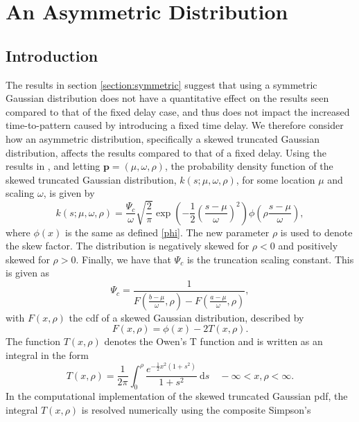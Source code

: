 \section{An Asymmetric Distribution}
\subsection{Introduction}
The results in section \ref{section:symmetric} suggest that using a symmetric Gaussian distribution does not have a quantitative effect on the results seen compared to that of the fixed delay case, and thus does not impact the increased time-to-pattern caused by introducing a fixed time delay. We therefore consider how an asymmetric distribution, specifically a skewed truncated Gaussian distribution, affects the results compared to that of a fixed delay. Using the results in \cite{skewed}, and letting $\textbf{p}=(\mu,\omega,\rho)$, the probability density function of the skewed truncated Gaussian distribution, $k(s;\mu,\omega,\rho)$, for some location $\mu$ and scaling $\omega$, is given by
\begin{equation}
    k(s;\mu,\omega,\rho)=\frac{\Psi_c}{\omega}\sqrt{\frac{2}{\pi}}\exp\left(-\frac{1}{2}\left(\frac{s-\mu}{\omega}\right)^2\right)\phi\left(\rho\frac{s-\mu}{\omega}\right),
\end{equation}
where $\phi(x)$ is the same as defined \eqref{phi}. The new parameter $\rho$ is used to denote the skew factor. The distribution is negatively skewed for $\rho<0$ and positively skewed for $\rho>0$. Finally, we have that $\Psi_c$ is the truncation scaling constant. This is given as
\begin{equation}
    \Psi_c=\frac{1}{F\left(\frac{b-\mu}{\omega},\rho\right)-F\left(\frac{a-\mu}{\omega},\rho\right)},
\end{equation}
with $F(x,\rho)$ the cdf of a skewed Gaussian distribution, described by
\begin{equation}
    F(x,\rho)=\phi(x)-2T(x,\rho).
\end{equation}
The function $T(x,\rho)$ denotes the Owen's T function \cite{owenst} and is written as an integral in the form
\begin{equation}
    T(x,\rho)=\frac{1}{2\pi}\int_0^\rho\frac{e^{-\frac{1}{2}x^2(1+s^2)}}{1+s^2}\ \text{d}s\quad -\infty<x,\rho<\infty.
\end{equation}
In the computational implementation of the skewed truncated Gaussian pdf, the integral $T(x,\rho)$ is resolved numerically using the composite Simpson's 

